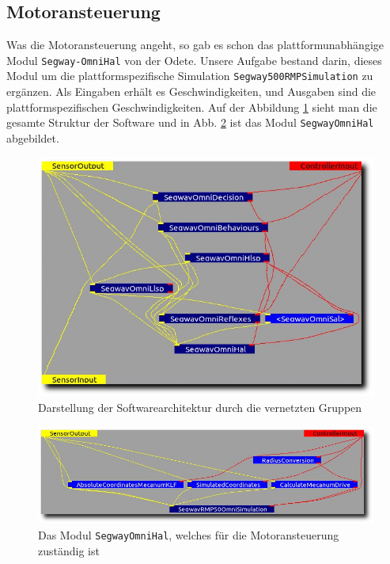 \subsection{Motoransteuerung}
\label{bahnplanung_motoansteuerung_subsec}
\authorsection{\editoroier}



Was die Motoransteuerung angeht, so gab es schon das plattformunabhängige Modul
\lstinline{Segway-}\lstinline{OmniHal} von der Odete.
Unsere Aufgabe bestand darin, dieses Modul um die plattformspezifische Simulation \lstinline{Segway500RMPSimulation} zu ergänzen.
Als Eingaben erhält es Geschwindigkeiten, und Ausgaben sind die plattformspezifischen Geschwindigkeiten.
Auf der Abbildung \ref{fig:mca2architecture} sieht man die gesamte Struktur der Software und in Abb. \ref{fig:segwayHal} ist das Modul \lstinline{SegwayOmniHal} abgebildet.

\begin{figure}[h]
	\center
	\includegraphics[scale=0.5]{graphics/mca2architecture.png}
	\caption{\label{fig:mca2architecture} Darstellung der Softwarearchitektur durch die vernetzten Gruppen}
\end{figure}

\begin{figure}[h]
	\center
	\includegraphics[scale=0.5]{graphics/segwayHal.png}
	\caption{\label{fig:segwayHal} Das Modul \lstinline{SegwayOmniHal}, welches für die Motoransteuerung zuständig ist}
\end{figure}


